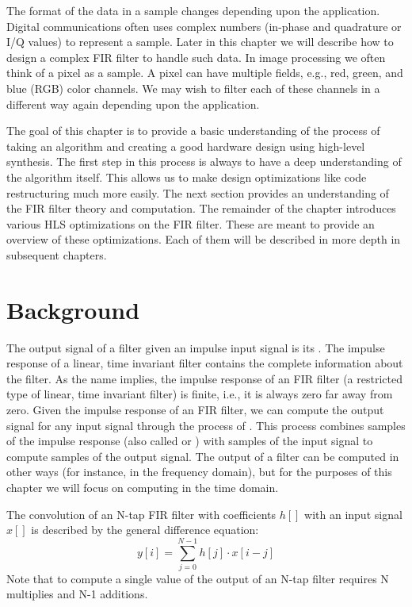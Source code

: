 The format of the data in a sample changes depending upon the application. Digital communications often uses complex numbers (in-phase and quadrature or I/Q values) to represent a sample. Later in this chapter we will describe how to design a complex FIR filter to handle such data. In image processing we often think of a pixel as a sample. A pixel can have multiple fields, e.g., red, green, and blue (RGB) color channels.  We may wish to filter each of these channels in a different way again depending upon the application.

The goal of this chapter is to provide a basic understanding of the process of taking an algorithm and creating a good hardware design using high-level synthesis. The first step in this process is always to have a deep understanding of the algorithm itself. This allows us to make design optimizations like code restructuring much more easily. The next section provides an understanding of the FIR filter theory and computation. The remainder of the chapter introduces various HLS optimizations on the FIR filter. These are meant to provide an overview of these optimizations. Each of them will be described in more depth in subsequent chapters. 

\section{Background}

The output signal of a filter given an impulse input signal is its . The impulse response of a linear, time invariant filter contains the complete information about the filter. As the name implies, the impulse response of an FIR filter (a restricted type of linear, time invariant filter) is finite, i.e., it is always zero far away from zero.  Given the impulse response of an FIR filter, we can compute the output signal for any input signal through the process of .  This process combines samples of the impulse response (also called  or ) with samples of the input signal to compute samples of the output signal.  The output of a filter can be computed in other ways (for instance, in the frequency domain), but for the purposes of this chapter we will focus on computing in the time domain.

The convolution of an N-tap FIR filter with coefficients $h[]$ with an input signal $x[]$ is described by the general difference equation:
\begin{equation}
y[i] =  \displaystyle\sum\limits_{j=0}^{N-1} h[j] \cdot x[i-j]
\end{equation}
Note that to compute a single value of the output of an N-tap filter requires N multiplies and N-1 additions.

